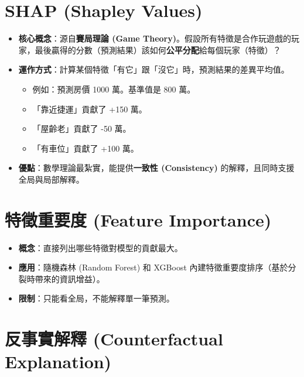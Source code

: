 \documentclass[
  letterpaper,
  DIV=11,
  numbers=noendperiod]{scrreprt}
\providecommand{\tightlist}{%
  \setlength{\itemsep}{0pt}\setlength{\parskip}{0pt}}
\begin{document}
\section{SHAP (Shapley Values)}\label{sec-shap}

\begin{itemize}
\tightlist
\item
  \textbf{核心概念}：源自\textbf{賽局理論 (Game
  Theory)}。假設所有特徵是合作玩遊戲的玩家，最後贏得的分數（預測結果）該如何\textbf{公平分配}給每個玩家（特徵）？
\item
  \textbf{運作方式}：計算某個特徵「有它」跟「沒它」時，預測結果的差異平均值。

  \begin{itemize}
  \tightlist
  \item
    例如：預測房價 1000 萬。基準值是 800 萬。
  \item
    「靠近捷運」貢獻了 +150 萬。
  \item
    「屋齡老」貢獻了 -50 萬。
  \item
    「有車位」貢獻了 +100 萬。
  \end{itemize}
\item
  \textbf{優點}：數學理論最紮實，能提供\textbf{一致性 (Consistency)}
  的解釋，且同時支援全局與局部解釋。
\end{itemize}

\section{特徵重要度 (Feature Importance)}\label{sec-feature-importance}

\begin{itemize}
\tightlist
\item
  \textbf{概念}：直接列出哪些特徵對模型的貢獻最大。
\item
  \textbf{應用}：隨機森林 (Random Forest) 和 XGBoost
  內建特徵重要度排序（基於分裂時帶來的資訊增益）。
\item
  \textbf{限制}：只能看全局，不能解釋單一筆預測。
\end{itemize}

\section{反事實解釋 (Counterfactual
Explanation)}\label{sec-counterfactual}
\end{document}
